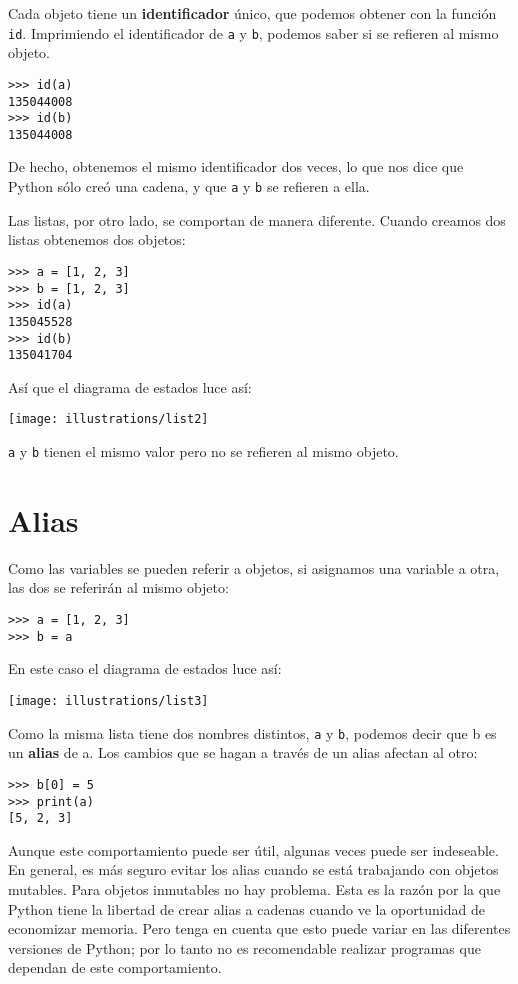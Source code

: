 Cada objeto tiene un \textbf{identificador} único, que podemos obtener
con la función \texttt{id}. Imprimiendo el identificador de \texttt{a}
y \texttt{b}, podemos saber si se refieren al mismo objeto.
\begin{lstlisting}
>>> id(a)
135044008
>>> id(b)
135044008
\end{lstlisting}

De hecho, obtenemos el mismo identificador dos veces, lo que nos dice
que Python sólo creó una cadena, y que \texttt{a} y \texttt{b} se
refieren a ella.

Las listas, por otro lado, se comportan de manera diferente. Cuando
creamos dos listas obtenemos dos objetos:
\begin{lstlisting}
>>> a = [1, 2, 3]
>>> b = [1, 2, 3]
>>> id(a)
135045528
>>> id(b)
135041704
\end{lstlisting}

Así que el diagrama de estados luce así:

\beforefig \centerline{\texttt{[image: illustrations/list2]}}
\afterfig

\texttt{a} y \texttt{b} tienen el mismo valor pero no se refieren
al mismo objeto.

\section{Alias}

 

Como las variables se pueden referir a objetos, si asignamos una variable
a otra, las dos se referirán al mismo objeto:
\begin{lstlisting}
>>> a = [1, 2, 3]
>>> b = a
\end{lstlisting}

En este caso el diagrama de estados luce así:

\beforefig \centerline{\texttt{[image: illustrations/list3]}}
\afterfig

Como la misma lista tiene dos nombres distintos, \texttt{a} y \texttt{b},
podemos decir que b es un \textbf{alias} de a. Los cambios que se
hagan a través de un alias afectan al otro:
\begin{lstlisting}
>>> b[0] = 5
>>> print(a)
[5, 2, 3]
\end{lstlisting}

Aunque este comportamiento puede ser útil, algunas veces puede ser
indeseable. En general, es más seguro evitar los alias cuando se está
trabajando con objetos mutables. Para objetos inmutables no hay problema.
Esta es la razón por la que Python tiene la libertad de crear alias
a cadenas cuando ve la oportunidad de economizar memoria. Pero tenga
en cuenta que esto puede variar en las diferentes versiones de Python;
por lo tanto no es recomendable realizar programas que dependan de
este comportamiento.

